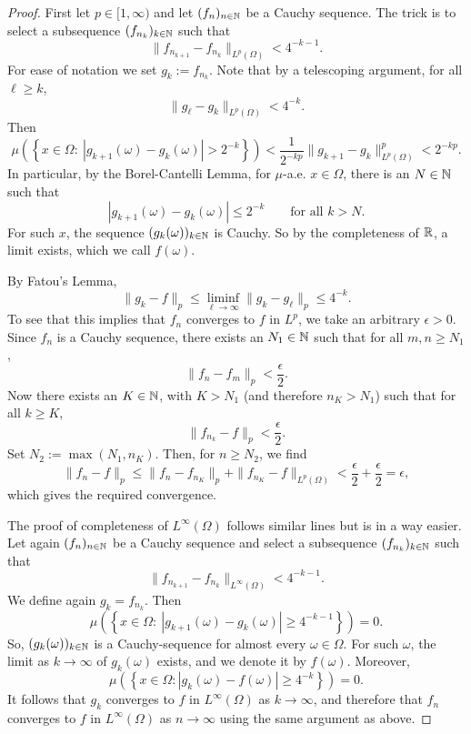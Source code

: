 \begin{proof}
First let $p \in [1,\infty)$ and let $(f_n)_{n\in\mathbb N}$ be a Cauchy sequence. The trick is to select a subsequence $(f_{n_k})_{k\in\mathbb N}$ such that 
\[
\| f_{n_{k+1}} - f_{n_k} \|_{L^p(\Omega)} < 4^{-k-1}.
\]
For ease of notation we set $g_k := f_{n_{k}}$.
Note that by a telescoping argument, for all $\ell \geq k$,
\[
\| g_\ell - g_k \|_{L^p(\Omega)} < 4^{-k}.
\]
Then
\[
\mu \left(\left\{ x \in \Omega : \ |g_{k+1}(\omega) - g_k(\omega) | 
> 2^{-k}  \right\} \right) < \frac{1}{2^{-k p} }\| g_{k+1} - g_k \|_{L^p(\Omega)}^p <2^{-kp}.
\]
In particular, by the Borel-Cantelli Lemma, for $\mu$-a.e. $x \in \Omega$, there is an $N \in \mathbb N$ such that
\[
|g_{k+1}(\omega) - g_k(\omega)| \leq 2^{-k}\qquad\text{for all $k > N$}.
\]
For such $x$, the sequence $(g_k(\omega))_{k\in\mathbb N}$ is Cauchy. So by the completeness of $\mathbb R$, a limit exists, which we call $f(\omega)$.

By Fatou's Lemma,
\[
\| g_k - f\|_p \leq \liminf_{\ell \to \infty} \| g_k - g_\ell \|_p \leq 4^{-k}.
\]
To see that this implies that $f_n$ converges to $f$ in $L^p$, we take an arbitrary $\epsilon > 0$. 
Since $f_n$ is a Cauchy sequence, there exists an $N_1 \in \mathbb N$ such that for all $m, n \geq N_1$,
\[
\|f_{n} - f_m\|_{p} < \frac{\epsilon}{2}.
\]
Now there exists an $K \in \mathbb N$, with $K > N_1$ (and therefore $n_K > N_1$) such that for all $k \geq K$,
\[
\|f_{n_k} - f \|_{p} < \frac{\epsilon}{2}.
\]
Set $N_2 := \max( N_1, n_{K} )$. Then, for $n \geq N_2$, we find
\[
\| f_n - f \|_{p} 
\leq \| f_{n} - f_{n_{K}} \|_{p} + \|f_{n_K} - f\|_{L^p(\Omega)}  < \frac{\epsilon}{2} + \frac{\epsilon}{2} = \epsilon,
\]
which gives the required convergence.

The proof of completeness of $L^\infty(\Omega)$ follows similar lines but is in a way easier. Let again $(f_n)_{n\in\mathbb N}$ be a Cauchy sequence and select a subsequence $(f_{n_k})_{k\in\mathbb N}$ such that
\[
\| f_{n_{k+1}} - f_{n_k} \|_{L^\infty(\Omega)} < 4^{-k-1}.
\]
We define again $g_k = f_{n_k}$.
Then
\[
\mu\left( \left\{ x \in \Omega : \ |g_{k+1}(\omega) - g_k(\omega) | \geq 4^{-k-1} \right\} \right) = 0.
\]
So, $(g_k(\omega))_{k\in\mathbb N}$ is a Cauchy-sequence for almost every $\omega \in \Omega$.
For such $\omega$, the limit as $k \to \infty$ of $g_k(\omega)$ exists, and we denote it by $f(\omega)$.
Moreover, 
\[
\mu\left( \left\{ x \in \Omega : |g_k(\omega) - f(\omega)|  \geq 4^{-k} \right\} \right) = 0.
\]
It follows that $g_k$ converges to $f$ in $L^\infty(\Omega)$ as $k \to \infty$, and therefore that $f_n$ converges to $f$ in $L^\infty(\Omega)$ as $n \to \infty$ using the same argument as above.
\end{proof}

